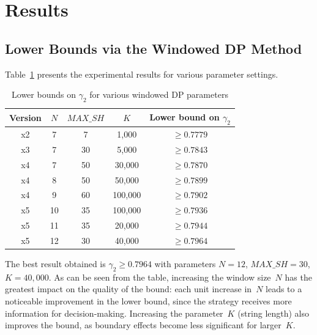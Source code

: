 \documentclass[12pt,a4paper]{article}
\begin{document}
\section{Results}
\label{sec:results}
\subsection{Lower Bounds via the Windowed DP Method}
Table~\ref{tab:dp_results} presents the experimental results for various parameter settings.
\begin{table}[h]
\centering
\caption{Lower bounds on $\gamma_2$ for various windowed DP parameters}
\label{tab:dp_results}
\begin{tabular}{ccccc}
  \toprule
  Version & $N$ & $\mathit{MAX\_SH}$ & $K$ & Lower bound on $\gamma_2$ \\
  \midrule
  x2 & 7 & 7 & 1{,}000 & $\geq 0.7779$ \\
  x3 & 7 & 30 & 5{,}000 & $\geq 0.7843$ \\
  x4 & 7 & 50 & 30{,}000 & $\geq 0.7870$ \\
  x4 & 8 & 50 & 50{,}000 & $\geq 0.7899$ \\
  x4 & 9 & 60 & 100{,}000 & $\geq 0.7902$ \\
  x5 & 10 & 35 & 100{,}000 & $\geq 0.7936$ \\
  x5 & 11 & 35 & 20{,}000 & $\geq 0.7944$ \\
  x5 & 12 & 30 & 40{,}000 & $\geq \mathbf{0.7964}$ \\
  \bottomrule
\end{tabular}
\end{table}
The best result obtained is $\gamma_2 \geq 0.7964$ with parameters $N = 12$, $\mathit{MAX\_SH} = 30$, $K = 40{,}000$.
As can be seen from the table, increasing the window size~$N$ has the greatest impact on the quality of the bound: each unit increase in~$N$ leads to a noticeable improvement in the lower bound, since the strategy receives more information for decision-making.
Increasing the parameter~$K$ (string length) also improves the bound, as boundary effects become less significant for larger~$K$.
\end{document}
